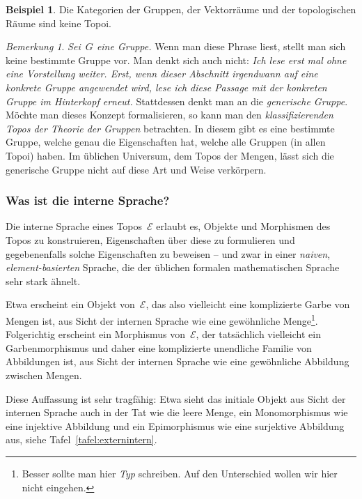 \documentclass[a4paper,ngerman,12pt]{scrartcl}
\theoremstyle{definition}
\newtheorem{bsp}[defn]{Beispiel}
\theoremstyle{plain}
\theoremstyle{remark}
\newtheorem{bem}[defn]{Bemerkung}
\newcommand{\E}{\mathcal{E}}
\renewcommand{\_}{\mathpunct{.}\,}
\newcommand{\?}{\,{:}\,}
\begin{document}
\begin{bsp}Die Kategorien der Gruppen, der Vektorräume und der topologischen Räume sind
keine Topoi.\end{bsp}

\begin{bem}\emph{Sei~$G$ eine Gruppe.} Wenn man diese Phrase liest, stellt
man sich keine bestimmte Gruppe vor. Man denkt sich auch nicht: \emph{Ich lese
erst mal ohne eine Vorstellung weiter. Erst, wenn dieser Abschnitt irgendwann
auf eine konkrete Gruppe angewendet wird, lese ich diese Passage mit der
konkreten Gruppe im Hinterkopf erneut.} Stattdessen denkt man an die
\emph{generische Gruppe}. Möchte man dieses Konzept formalisieren, so kann man
den \emph{klassifizierenden Topos der Theorie der Gruppen} betrachten. In
diesem gibt es eine bestimmte Gruppe, welche genau die Eigenschaften
hat, welche alle Gruppen (in allen Topoi) haben. Im üblichen Universum, dem
Topos der Mengen, lässt sich die generische Gruppe nicht auf diese Art und
Weise verkörpern.\end{bem}


\subsubsection*{Was ist die interne Sprache?}

Die interne Sprache eines Topos~$\E$ erlaubt es,
Objekte und Morphismen des Topos zu konstruieren,
Eigenschaften über diese zu formulieren und
gegebenenfalls solche Eigenschaften zu beweisen --
und zwar in einer \emph{naiven}, \emph{element-basierten} Sprache, die der
üblichen formalen mathematischen Sprache sehr stark ähnelt.

Etwa erscheint ein Objekt von~$\E$, das also vielleicht eine komplizierte Garbe
von Mengen ist, aus Sicht der internen Sprache wie eine gewöhnliche
Menge\footnote{Besser sollte man hier \emph{Typ} schreiben. Auf den
Unterschied wollen wir hier nicht eingehen.}. Folgerichtig erscheint ein
Morphismus von~$\E$, der tatsächlich vielleicht ein Garbenmorphismus und daher
eine komplizierte unendliche
Familie von Abbildungen ist, aus Sicht der internen Sprache wie eine
gewöhnliche Abbildung zwischen Mengen.

Diese Auffassung ist sehr tragfähig: Etwa sieht das initiale Objekt aus Sicht
der internen Sprache auch in der Tat wie die leere Menge, ein Monomorphismus
wie eine injektive Abbildung und ein Epimorphismus wie eine surjektive
Abbildung aus, siehe Tafel~\ref{tafel:externintern}.
\end{document}
